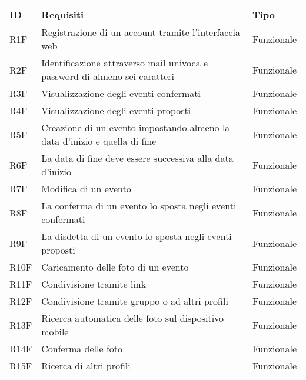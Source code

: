 \begin{longtable} {|P{1.3cm}|P{11.2cm}|P{3cm}|}
    \hline
    \textbf{ID} & \textbf{Requisiti}                                                          & \textbf{Tipo}  \\
    \hline
    \endhead
    R1F         & Registrazione di un account tramite l’interfaccia web                       & Funzionale     \\
    \hline
    R2F         & Identificazione attraverso mail univoca e password di almeno sei caratteri    & Funzionale     \\
    \hline
    R3F         & Visualizzazione degli eventi confermati                                     & Funzionale     \\
    \hline
    R4F         & Visualizzazione degli eventi proposti                                       & Funzionale     \\
    \hline
    R5F         & Creazione di un evento impostando almeno la data d'inizio e quella di fine & Funzionale     \\
    \hline
    R6F         & La data di fine deve essere successiva alla data d'inizio                  & Funzionale     \\
    \hline
    R7F         & Modifica di un evento                                                       & Funzionale     \\
    \hline
    R8F         & La conferma di un evento lo sposta negli eventi confermati                  & Funzionale     \\
    \hline
    R9F         & La disdetta di un evento lo sposta negli eventi proposti                    & Funzionale     \\
    \hline
    R10F        & Caricamento delle foto di un evento                                         & Funzionale     \\
    \hline
    R11F        & Condivisione tramite link                                                   & Funzionale     \\
    \hline
    R12F        & Condivisione tramite gruppo o ad altri profili                              & Funzionale     \\
    \hline
    R13F        & Ricerca automatica delle foto sul dispositivo mobile                        & Funzionale     \\
    \hline
    R14F        & Conferma delle foto                                                         & Funzionale     \\
    \hline
    R15F        & Ricerca di altri profili                                                    & Funzionale     \\

\end{longtable}
